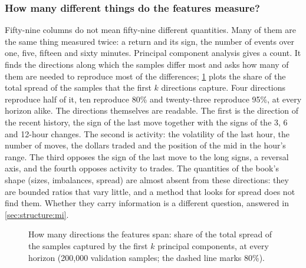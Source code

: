 \subsubsection{How many different things do the features measure?}
\label{sec:structure:dim}

Fifty-nine columns do not mean fifty-nine different quantities.  Many of them are the same
thing measured twice: a return and its sign, the number of events over one, five, fifteen
and sixty minutes.  Principal component analysis gives a count.  It finds the directions
along which the samples differ most and asks how many of them are needed to reproduce most
of the differences; \cref{fig:structure:spectrum} plots the share of the total spread of
the samples that the first $k$ directions capture.  Four directions reproduce half of it,
ten reproduce 80\% and twenty-three reproduce 95\%, at every horizon alike.  The
directions themselves are readable.  The first is the direction of the recent history, the
sign of the last move together with the signs of the 3, 6 and 12-hour changes.  The second
is activity: the volatility of the last hour, the number of moves, the dollars traded and
the position of the mid in the hour's range.  The third opposes the sign of the last move
to the long signs, a reversal axis, and the fourth opposes activity to trades.  The
quantities of the book's shape (sizes, imbalances, spread) are almost absent from these
directions: they are bounded ratios that vary little, and a method that looks for spread
does not find them.  Whether they carry information is a different question, answered in
\cref{sec:structure:mi}.

\begin{figure}[t]
\centering

\caption{How many directions the features span: share of the total spread of the samples
captured by the first $k$ principal components, at every horizon (200{,}000 validation
samples; the dashed line marks 80\%).}
\label{fig:structure:spectrum}
\end{figure}

